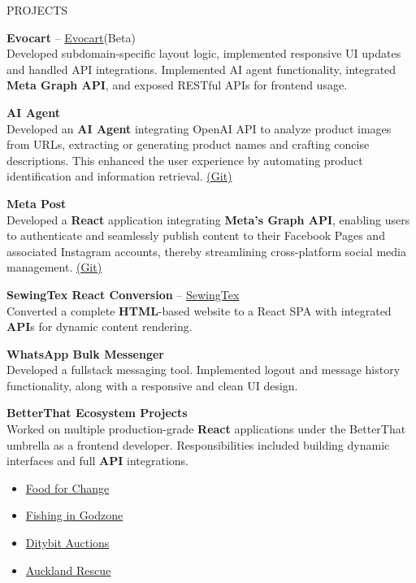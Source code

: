\documentclass{resume} %
\begin{document}
\begin{rSection}{PROJECTS}
\vspace{-1.25em}
\item \textbf{Evocart} – \href{https://apple.nazarahnaturals.com/}{Evocart}(Beta) \\
Developed subdomain-specific layout logic, implemented responsive UI updates and handled API integrations.
Implemented AI agent functionality, integrated \textbf{Meta Graph API}, and exposed RESTful APIs for frontend usage.

\item \textbf{AI Agent} \\
Developed an \textbf{AI Agent} integrating OpenAI API to analyze product images from URLs, extracting or generating product names and crafting concise descriptions. This enhanced the user experience by automating product identification and information retrieval.
\href{https://github.com/rafidrahman1/ai_agent}{(Git)}

\item \textbf{Meta Post} \\
Developed a \textbf{React} application integrating \textbf{Meta's Graph API}, enabling users to authenticate and seamlessly publish content to their Facebook Pages and associated Instagram accounts, thereby streamlining cross-platform social media management.
\href{https://github.com/rafidrahman1/meta_post}{(Git)}

\item \textbf{SewingTex React Conversion} – \href{https://sewingtexapparels.com/}{SewingTex} \\
Converted a complete \textbf{HTML}-based website to a React SPA with integrated \textbf{API}s for dynamic content rendering.

\item \textbf{WhatsApp Bulk Messenger} \\
Developed a fullstack messaging tool. Implemented logout and message history functionality, along with a responsive and clean UI design.

\item \textbf{BetterThat Ecosystem Projects} \\
Worked on multiple production-grade \textbf{React} applications under the BetterThat umbrella as a frontend developer. Responsibilities included building dynamic interfaces and full \textbf{API} integrations.
\begin{itemize}
    \item \href{https://ffc.betterthatconnect.com/}{Food for Change}
    \item \href{https://fig.betterthatconnect.com/}{Fishing in Godzone}
    \item \href{https://ditybit.com/}{Ditybit Auctions}
    \item \href{https://ar.betterthatconnect.com/}{Auckland Rescue}
\end{itemize}



\end{rSection}
\end{document}
